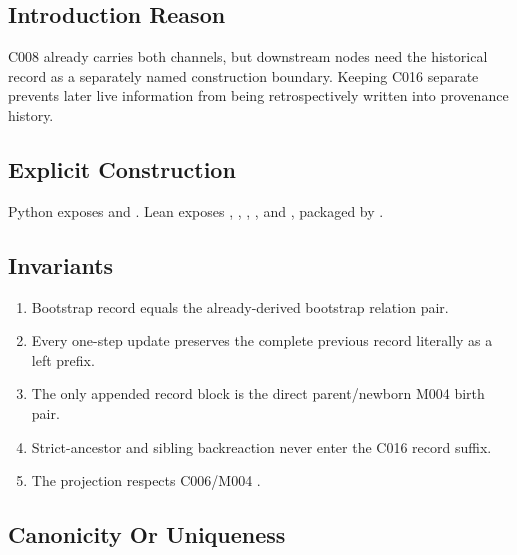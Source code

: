 \subsection{Introduction Reason}\label{introduction-reason-27}

C008 already carries both channels, but downstream nodes need the
historical record as a separately named construction boundary. Keeping
C016 separate prevents later live information from being retrospectively
written into provenance history.

\subsection{Explicit Construction}\label{explicit-construction-11}

Python exposes \texttt{\protect{}} and
\texttt{\protect{}}. Lean exposes
\texttt{\protect{}}, \texttt{\protect{}},
\texttt{\protect{}},
\texttt{\protect{}}, and
\texttt{\protect{}}, packaged by
\texttt{\protect{}}.

\subsection{Invariants}\label{invariants-11}

\begin{enumerate}
\def\labelenumi{\arabic{enumi}.}
\tightlist
\item
  Bootstrap record equals the already-derived bootstrap relation pair.
\item
  Every one-step update preserves the complete previous record literally
  as a left prefix.
\item
  The only appended record block is the direct parent/newborn M004 birth
  pair.
\item
  Strict-ancestor and sibling backreaction never enter the C016 record
  suffix.
\item
  The projection respects C006/M004 \texttt{\protect{}}.
\end{enumerate}

\subsection{Canonicity Or Uniqueness}\label{canonicity-or-uniqueness-11}

